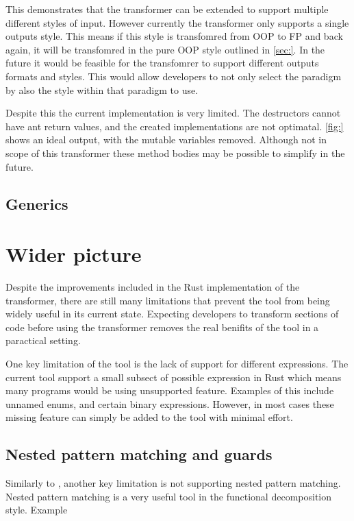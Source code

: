 \documentclass[ oneside,%
                    author={James Elgar},
                    degree={MEng},
                     title={Bidirectional transformer between functional and \\ object-oriented programming in Rust},
                  subtitle={}]{dissertation}
\begin{document}
This demonstrates that the transformer can be extended to support multiple different styles of input. However currently the transformer only supports a single outputs style. This means if this style is transfomred from OOP to FP and back again, it will be transfomred in the pure OOP style outlined in \autoref{sec:}.
In the future it would be feasible for the transfomrer to support different outputs formats and styles. This would allow developers to not only select the paradigm by also the style within that paradigm to use.

Despite this the current implementation is very limited. The destructors cannot have ant return values, and the created implementations are not optimatal. \autoref{fig:} shows an ideal output, with the mutable variables removed. Although not in scope of this transformer these method bodies may be possible to simplify in the future.

\subsection{Generics}

\section{Wider picture}

Despite the improvements included in the Rust implementation of the transformer, there are still many limitations that prevent the tool from being widely useful in its current state. Expecting developers to transform sections of code before using the transformer removes the real benifits of the tool in a paractical setting.

One key limitation of the tool is the lack of support for different expressions. The current tool support a small subsect of possible expression in Rust which means many programs would be using unsupported feature. Examples of this include unnamed enums, and certain binary expressions. However, in most cases these missing feature can simply be added to the tool with minimal effort.

\subsection{Nested pattern matching and guards}

Similarly to \cite{food}, another key limitation is not supporting nested pattern matching. Nested pattern matching is a very useful tool in the functional decomposition style. Example
\end{document}
